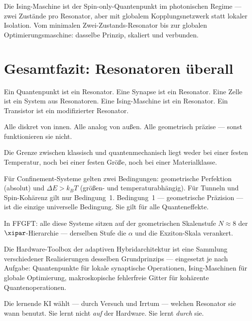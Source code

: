 Die Ising-Maschine ist der Spin-only-Quantenpunkt im photonischen
Regime --- zwei Zustände pro Resonator, aber mit globalem
Kopplungsnetzwerk statt lokaler Isolation.
Vom minimalen Zwei-Zustands-Resonator bis zur globalen
Optimierungsmaschine: dasselbe Prinzip, skaliert und verbunden.

\section{Gesamtfazit: Resonatoren überall}
\label{sec:fazit}

\begin{conclusionBox}[Fazit]
Ein Quantenpunkt ist ein Resonator.
Eine Synapse ist ein Resonator.
Eine Zelle ist ein System aus Resonatoren.
Eine Ising-Maschine ist ein Resonator.
Ein Transistor ist ein modifizierter Resonator.

Alle diskret von innen. Alle analog von außen.
Alle geometrisch präzise --- sonst funktionieren sie nicht.

Die Grenze zwischen klassisch und quantenmechanisch liegt
weder bei einer festen Temperatur, noch bei einer festen Größe,
noch bei einer Materialklasse.

Für Confinement-Systeme gelten zwei Bedingungen:
geometrische Perfektion (absolut) und $\Delta E > k_BT$
(größen- und temperaturabhängig).
Für Tunneln und Spin-Kohärenz gilt nur Bedingung~1.
Bedingung~1 --- geometrische Präzision --- ist die einzige
universelle Bedingung. Sie gilt für alle Quanteneffekte.

In FFGFT: alle diese Systeme sitzen auf der geometrischen
Skalenstufe $N \approx 8$ der $\xipar$-Hierarchie ---
derselben Stufe die $\alpha$ und die Exziton-Skala verankert.
\end{conclusionBox}

\begin{significance}
Die Hardware-Toolbox der adaptiven Hybridarchitektur
ist eine Sammlung verschiedener Realisierungen desselben
Grundprinzips --- eingesetzt je nach Aufgabe:
Quantenpunkte für lokale synaptische Operationen,
Ising-Maschinen für globale Optimierung,
makroskopische fehlerfreie Gitter für kohärente Quantenoperationen.

Die lernende KI wählt --- durch Versuch und Irrtum ---
welchen Resonator sie wann benutzt.
Sie lernt nicht \textit{auf} der Hardware.
Sie lernt \textit{durch} sie.
\end{significance}

